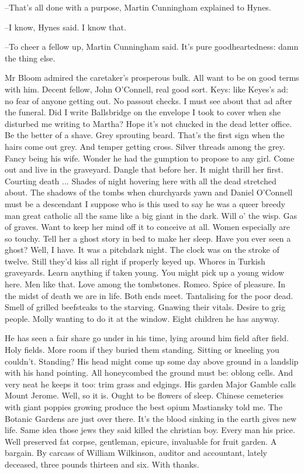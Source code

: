--That's all done with a purpose,
Martin Cunningham explained to Hynes.

--I know, Hynes said.
I know that.

--To cheer a fellow up, Martin Cunningham said.
It's pure goodheartedness:
damn the thing else.

Mr Bloom admired the caretaker's prosperous bulk.
All want to be on good terms with him.
Decent fellow, John O'Connell, real good sort.
Keys:
like Keyes's ad:
no fear of anyone getting out.
No passout checks.
I must see about that ad after the funeral.
Did I write Ballsbridge on the envelope I took to cover
when she disturbed me writing to Martha?
Hope it's not chucked in the dead letter office.
Be the better of a shave.
Grey sprouting beard.
That's the first sign when the hairs come out grey.
And temper getting cross.
Silver threads among the grey.
Fancy being his wife.
Wonder he had the gumption to propose to any girl.
Come out and live in the graveyard.
Dangle that before her.
It might thrill her first.
Courting death ...
Shades of night hovering here with all the dead stretched about.
The shadows of the tombs when churchyards yawn
and Daniel O'Connell must be a descendant I suppose
who is this used to say
he was a queer breedy man
great catholic all the same
like a big giant in the dark.
Will o' the wisp.
Gas of graves.
Want to keep her mind off it to conceive at all.
Women especially are so touchy.
Tell her a ghost story in bed to make her sleep.
Have you ever seen a ghost?
Well, I have.
It was a pitchdark night.
The clock was on the stroke of twelve.
Still they'd kiss all right if properly keyed up.
Whores in Turkish graveyards.
Learn anything if taken young.
You might pick up a young widow here.
Men like that.
Love among the tombstones.
Romeo.
Spice of pleasure.
In the midst of death we are in life.
Both ends meet.
Tantalising for the poor dead.
Smell of grilled beefsteaks to the starving.
Gnawing their vitals.
Desire to grig people.
Molly wanting to do it at the window.
Eight children he has anyway.

He has seen a fair share go under in his time,
lying around him field after field.
Holy fields.
More room if they buried them standing.
Sitting or kneeling you couldn't.
Standing?
His head might come up some day above ground in a landslip with his hand pointing.
All honeycombed the ground must be:
oblong cells.
And very neat he keeps it too:
trim grass and edgings.
His garden Major Gamble calls Mount Jerome.
Well, so it is.
Ought to be flowers of sleep.
Chinese cemeteries with giant poppies growing produce the best opium
Mastiansky told me.
The Botanic Gardens are just over there.
It's the blood sinking in the earth gives new life.
Same idea those jews they said killed the christian boy.
Every man his price.
Well preserved fat corpse, gentleman, epicure,
invaluable for fruit garden.
A bargain.
By carcass of William Wilkinson, auditor and accountant, lately deceased,
three pounds thirteen and six.
With thanks.

